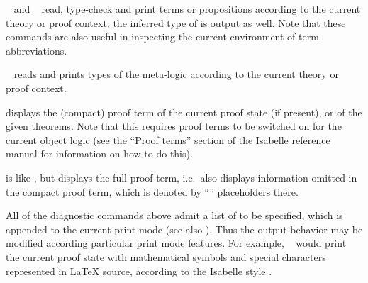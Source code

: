 \begin{isabellebody}
\begin{isamarkuptext}
\begin{descr}
  \item [\mbox{\isa{\isacommand{term}}}~\isa{t} and \mbox{\isa{\isacommand{prop}}}~\isa{{\isasymphi}}]
  read, type-check and print terms or propositions according to the
  current theory or proof context; the inferred type of  is
  output as well.  Note that these commands are also useful in
  inspecting the current environment of term abbreviations.

  \item [\mbox{\isa{\isacommand{typ}}}~\isa{{\isasymtau}}] reads and prints types of the
  meta-logic according to the current theory or proof context.

  \item [\mbox{\isa{\isacommand{prf}}}] displays the (compact) proof term of the
  current proof state (if present), or of the given theorems. Note
  that this requires proof terms to be switched on for the current
  object logic (see the ``Proof terms'' section of the Isabelle
  reference manual for information on how to do this).

  \item [\mbox{\isa{\isacommand{full{\isacharunderscore}prf}}}] is like \mbox{}, but displays
  the full proof term, i.e.\ also displays information omitted in the
  compact proof term, which is denoted by ``\isa{{\isacharunderscore}}'' placeholders
  there.

  \end{descr}

  All of the diagnostic commands above admit a list of 
  to be specified, which is appended to the current print mode (see
  also \cite{isabelle-ref}).  Thus the output behavior may be modified
  according particular print mode features.  For example, \mbox{}~ would print the current
  proof state with mathematical symbols and special characters
  represented in {\LaTeX} source, according to the Isabelle style
  \cite{isabelle-sys}.


\end{isamarkuptext}
\end{isabellebody}

